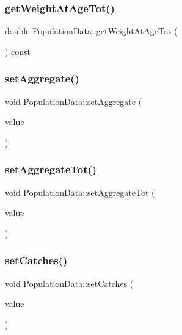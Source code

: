 \subsubsection{\texorpdfstring{getWeightAtAgeTot()}{getWeightAtAgeTot()}}
{\footnotesize\ttfamily double Population\+Data\+::get\+Weight\+At\+Age\+Tot (\begin{DoxyParamCaption}{ }\end{DoxyParamCaption}) const}

\mbox{\label{class_population_data_ae4564a189ea27190e5437ea1bd8a9dcb}} 
\subsubsection{\texorpdfstring{setAggregate()}{setAggregate()}}
{\footnotesize\ttfamily void Population\+Data\+::set\+Aggregate (\begin{DoxyParamCaption}\item[{const Q\+Vector$<$ double $>$ \&}]{value }\end{DoxyParamCaption})}

\mbox{\label{class_population_data_a04ea0c31603277770a60338ecae4556a}} 
\subsubsection{\texorpdfstring{setAggregateTot()}{setAggregateTot()}}
{\footnotesize\ttfamily void Population\+Data\+::set\+Aggregate\+Tot (\begin{DoxyParamCaption}\item[{double}]{value }\end{DoxyParamCaption})}

\mbox{\label{class_population_data_a04cd2bba84aa9b7d94d1fb959124fa17}} 
\subsubsection{\texorpdfstring{setCatches()}{setCatches()}}
{\footnotesize\ttfamily void Population\+Data\+::set\+Catches (\begin{DoxyParamCaption}\item[{const Q\+Vector$<$ double $>$ \&}]{value }\end{DoxyParamCaption})}

